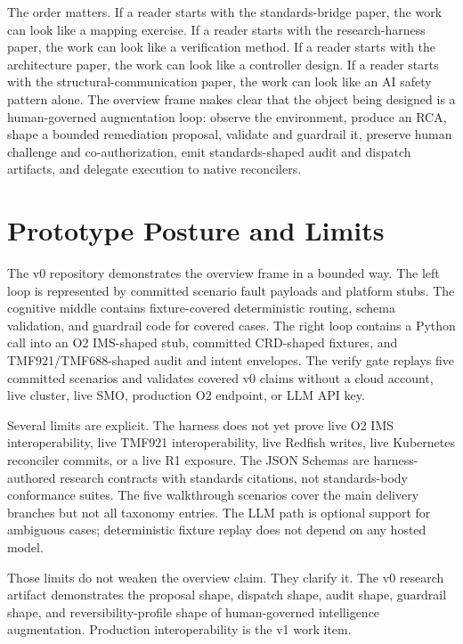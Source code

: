 \documentclass[twocolumn,10pt,a4paper]{article}
\begin{document}
The order matters. If a reader starts with the standards-bridge paper, the work can look like a mapping exercise. If a reader starts with the research-harness paper, the work can look like a verification method. If a reader starts with the architecture paper, the work can look like a controller design. If a reader starts with the structural-communication paper, the work can look like an AI safety pattern alone. The overview frame makes clear that the object being designed is a human-governed augmentation loop: observe the environment, produce an RCA, shape a bounded remediation proposal, validate and guardrail it, preserve human challenge and co-authorization, emit standards-shaped audit and dispatch artifacts, and delegate execution to native reconcilers.

\section{Prototype Posture and Limits}
\label{sec:limits}

The v0 repository demonstrates the overview frame in a bounded way. The left loop is represented by committed scenario fault payloads and platform stubs. The cognitive middle contains fixture-covered deterministic routing, schema validation, and guardrail code for covered cases. The right loop contains a Python call into an O2 IMS-shaped stub, committed CRD-shaped fixtures, and TMF921/TMF688-shaped audit and intent envelopes. The verify gate replays five committed scenarios and validates covered v0 claims without a cloud account, live cluster, live SMO, production O2 endpoint, or LLM API key.

Several limits are explicit. The harness does not yet prove live O2 IMS interoperability, live TMF921 interoperability, live Redfish writes, live Kubernetes reconciler commits, or a live R1 exposure. The JSON Schemas are harness-authored research contracts with standards citations, not standards-body conformance suites. The five walkthrough scenarios cover the main delivery branches but not all taxonomy entries. The LLM path is optional support for ambiguous cases; deterministic fixture replay does not depend on any hosted model.

Those limits do not weaken the overview claim. They clarify it. The v0 research artifact demonstrates the proposal shape, dispatch shape, audit shape, guardrail shape, and reversibility-profile shape of human-governed intelligence augmentation. Production interoperability is the v1 work item.
\end{document}
